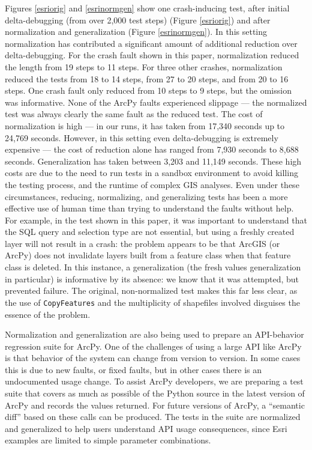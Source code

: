 
Figures \ref{esriorig} and
\ref{esrinormgen} show one crash-inducing test, after initial
delta-debugging (from over 2,000 test steps) (Figure \ref{esriorig})
and after normalization and generalization (Figure \ref{esrinormgen}).
In this setting normalization has contributed a significant amount of
additional reduction over delta-debugging.  For the crash fault shown
in this paper, normalization reduced the length from 19 steps to 11
steps.  For three other crashes, normalization reduced the tests
from 18 to 14 steps, from 27 to 20 steps, and from 20 to 16 steps. One crash fault only reduced from 10 steps to 9 steps, but the
omission was informative.  None of the ArcPy faults experienced slippage --- the normalized
test was always clearly the same fault as the reduced test.
 The cost of normalization is high --- in
our runs, it has taken from 17,340 seconds up to 24,769 seconds.
However, in this setting even delta-debugging is extremely expensive
--- the cost of reduction alone has ranged from 7,930 seconds to 8,688
seconds.  Generalization has taken between 3,203 and
 11,149 seconds.  These high costs are due to the need to run
tests in a sandbox environment to avoid killing the testing
process, and the runtime of complex GIS analyses.
Even under these circumstances, reducing, normalizing, and
generalizing tests has been a more effective use of human time than
trying to understand the faults without help.  For example, in
the test shown in this paper, it was important to understand that
the SQL query and selection type are not essential, but using a
freshly created layer will not result in a crash: the problem appears
to be that ArcGIS (or ArcPy) does not invalidate layers built from a
feature class when that feature class is deleted.  In this
  instance, a generalization (the fresh values generalization in
  particular) is informative by its absence: we know that it was attempted, but prevented
  failure.  The original, non-normalized test
makes this far less clear, as the use of {\tt CopyFeatures} and the
multiplicity of shapefiles involved disguises the essence of the
problem.  

Normalization and generalization are also being used to prepare an
API-behavior regression suite for ArcPy.  One of the challenges of
using a large API like ArcPy is that behavior of the system can change
from version to version.  In some cases this is due to new faults, or
fixed faults, but in other cases there is an undocumented usage change.  To assist ArcPy
developers, we are preparing a test suite that covers as much as
possible of the Python source in the latest version of ArcPy
and records the values returned.  For future versions of ArcPy, a ``semantic diff'' based on these calls
can be produced.  The tests in the suite are
normalized and generalized to help users understand API usage consequences, since Esri examples are limited to simple parameter combinations.

